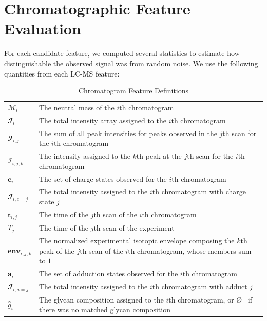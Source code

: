 \section{Chromatographic Feature Evaluation}\label{sec:feature_evaluation}
    For each candidate feature, we computed several statistics to estimate how distinguishable
    the observed signal was from random noise. We use the following quantities from each LC-MS
    feature:

    \renewcommand{\arraystretch}{1.5}
    \begin{table}
        \caption{Chromatogram Feature Definitions}\label{tbl:chromatogram_feature_definitions}
        \centering
        \begin{tabular}{l | p{9cm}}
            \hline
            $\mathcal{M}_i$          & The neutral mass of the $i$th chromatogram\\
            $\mathbfcal{I}_i$        & The total intensity array assigned to the $i$th chromatogram\\
            $\mathbfcal{I}_{i, j}$   & The sum of all peak intensities for peaks observed in
                                       the $j$th scan for the $i$th chromatogram\\
            $\mathcal{I}_{i, j, k}$  & The intensity assigned to the $k$th peak at the $j$th
                                       scan for the $i$th chromatogram\\
            $\mathbf{c}_i$           & The set of charge states observed for the $i$th chromatogram\\
            $\mathbfcal{I}_{i, c=j}$ & The total intensity assigned to the $i$th chromatogram
                                       with charge state $j$\\
            $\mathbf{t}_{i, j}$      & The time of the $j$th scan of the $i$th chromatogram\\
            $T_j$                    & The time of the $j$th scan of the experiment\\
            $\textbf{env}_{i, j, k}$ & The normalized experimental isotopic envelope composing
                                       the $k$th peak of the $j$th scan of the $i$th chromatogram,
                                       whose members sum to $1$\\
            $\mathbf{a}_i$           & The set of adduction states observed for the $i$th chromatogram\\
            $\mathbfcal{I}_{i, a=j}$ & The total intensity assigned to the $i$th
                                       chromatogram with adduct $j$\\
            ${\hat g}_i$             & The glycan composition assigned to the $i$th chromatogram, or \O
                                       \ if there was no matched glycan composition
        \end{tabular}
    \end{table}
    \renewcommand{\arraystretch}{1.0}

